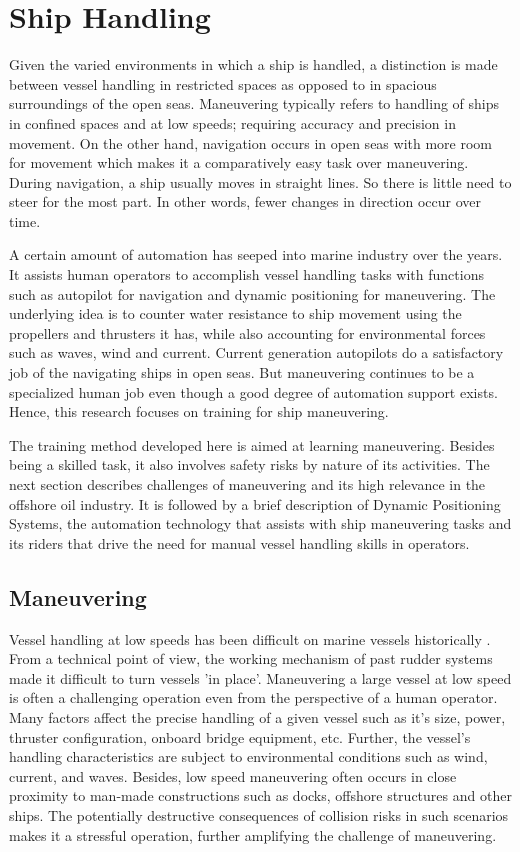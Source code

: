 \section{Ship Handling}

Given the varied environments in which a ship is handled, a distinction is made between vessel handling in restricted spaces as opposed to in spacious surroundings of the open seas. Maneuvering typically refers to handling of ships in confined spaces and at low speeds; requiring accuracy and precision in movement. On the other hand, navigation occurs in open seas with more room for movement which makes it a comparatively easy task over maneuvering. During navigation, a ship usually moves in straight lines. So there is little need to steer for the most part. In other words, fewer changes in direction occur over time. 

A certain amount of automation has seeped into marine industry over the years. It assists human operators to accomplish vessel handling tasks with functions such as autopilot for navigation and dynamic positioning for maneuvering. The underlying idea is to counter water resistance to ship movement using the propellers and thrusters it has, while also accounting for environmental forces such as waves, wind and current. Current generation autopilots do a satisfactory job of the navigating ships in open seas. But maneuvering continues to be a specialized human job even though a good degree of automation support exists. Hence, this research focuses on training for ship maneuvering. 

The training method developed here is aimed at learning maneuvering. Besides being a skilled task, it also involves safety risks by nature of its activities. The next section describes challenges of maneuvering and its high relevance in the offshore oil industry. It is followed by a brief description of Dynamic Positioning Systems, the automation technology that assists with ship maneuvering tasks and its riders that drive the need for manual vessel handling skills in operators. 

\subsection{Maneuvering}

Vessel handling at low speeds has been difficult on marine vessels historically \cite{brittanica:ship}. From a technical point of view, the working mechanism of past rudder systems made it difficult to turn vessels 'in place'. Maneuvering a large vessel at low speed is often a challenging operation even from the perspective of a human operator. Many factors affect the precise handling of a given vessel such as it's size, power, thruster configuration, onboard bridge equipment, etc. Further, the vessel's handling characteristics are subject to environmental conditions such as wind, current, and waves. Besides, low speed maneuvering often occurs in close proximity to man-made constructions such as docks, offshore structures and other ships. The potentially destructive consequences of collision risks in such scenarios makes it a stressful operation, further amplifying the challenge of maneuvering.

